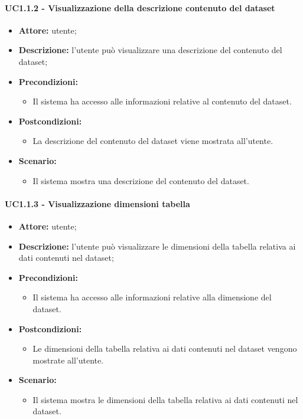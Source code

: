 \paragraph{UC1.1.2 - Visualizzazione della descrizione contenuto del dataset}
\begin{itemize}
    \item \textbf{Attore:} utente;
    \item \textbf{Descrizione:} l'utente può visualizzare una descrizione del contenuto del dataset;
    \item \textbf{Precondizioni:}
    \begin{itemize}
        \item Il sistema ha accesso alle informazioni relative al contenuto del dataset.
    \end{itemize}
    \item \textbf{Postcondizioni:}
    \begin{itemize}
        \item La descrizione del contenuto del dataset viene mostrata all'utente.
    \end{itemize}
    \item \textbf{Scenario:}
    \begin{itemize}
        \item Il sistema mostra una descrizione del contenuto del dataset.
    \end{itemize}
\end{itemize}
\paragraph{UC1.1.3 - Visualizzazione dimensioni tabella}
\begin{itemize}
    \item \textbf{Attore:} utente;
    \item \textbf{Descrizione:} l'utente può visualizzare le dimensioni della tabella relativa ai dati contenuti nel dataset;
    \item \textbf{Precondizioni:}
    \begin{itemize}
        \item Il sistema ha accesso alle informazioni relative alla dimensione del dataset.
    \end{itemize}
    \item \textbf{Postcondizioni:}
    \begin{itemize}
        \item Le dimensioni della tabella relativa ai dati contenuti nel dataset vengono mostrate all'utente.
    \end{itemize}
    \item \textbf{Scenario:}
    \begin{itemize}
        \item Il sistema mostra le dimensioni della tabella relativa ai dati contenuti nel dataset.
    \end{itemize}
\end{itemize}

